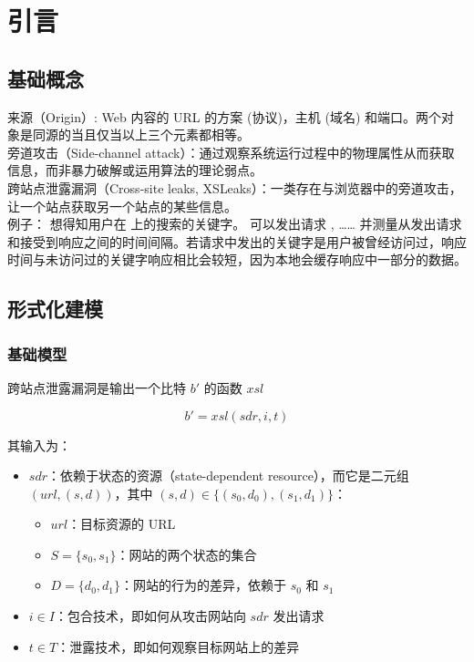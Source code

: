 \section{引言}

\subsection{基础概念}

来源（Origin）\cite{origin}: Web 内容的 URL 的方案 (协议)，主机 (域名) 和端口。两个对象是同源的当且仅当以上三个元素都相等。\\

旁道攻击（Side-channel attack）：通过观察系统运行过程中的物理属性从而获取信息，而非暴力破解或运用算法的理论弱点。\\

跨站点泄露漏洞（Cross-site leaks, XSLeaks）\cite{xsleaks}：一类存在与浏览器中的旁道攻击，让一个站点获取另一个站点的某些信息。\\


例子： 想得知用户在  上的搜索的关键字。 可以发出请求 ,  …… 并测量从发出请求和接受到响应之间的时间间隔。若请求中发出的关键字是用户被曾经访问过，响应时间与未访问过的关键字响应相比会较短，因为本地会缓存响应中一部分的数据。\\

\subsection{形式化建模}

\subsubsection{基础模型\cite{modelbase}}

跨站点泄露漏洞是输出一个比特 $b'$ 的函数 $xsl$

$$b'=xsl(sdr, i, t)$$

其输入为：

\begin{itemize}
    \item $sdr$：依赖于状态的资源（state-dependent resource），而它是二元组 $(url, (s, d))$，其中 $(s, d)\in\{(s_0, d_0), (s_1, d_1)\}$：
    \begin{itemize}
        \item $url$：目标资源的 URL
        \item $S=\{s_0, s_1\}$：网站的两个状态的集合
        \item $D=\{d_0, d_1\}$：网站的行为的差异，依赖于 $s_0$ 和 $s_1$
    \end{itemize}
    \item $i\in I$：包合技术，即如何从攻击网站向 $sdr$ 发出请求
    \item $t\in T$：泄露技术，即如何观察目标网站上的差异
\end{itemize}

